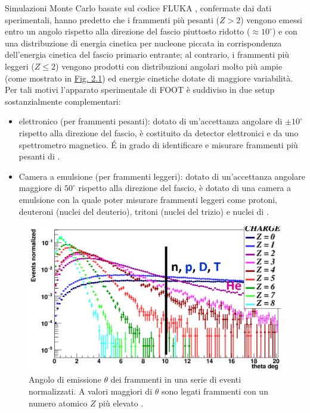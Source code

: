 \documentclass[12pt,a4paper,twoside]{report}
\begin{document}
	Simulazioni Monte Carlo basate sul codice FLUKA \cite{Ferrari:2005zk,BOHLEN2014211}, confermate dai dati sperimentali, hanno predetto che i frammenti più pesanti ($Z>2$) vengono emessi entro un angolo rispetto alla direzione del fascio piuttosto ridotto ($\approx10^\circ$) e con una distribuzione di energia cinetica per nucleone piccata in corrispondenza dell'energia cinetica del fascio primario entrante; al contrario, i frammenti più leggeri ($Z\le2$) vengono prodotti con distribuzioni angolari molto più ampie (come mostrato in \hyperref[fig:angular]{Fig. 2.1}) ed energie cinetiche dotate di maggiore variabilità. Per tali motivi l'apparato sperimentale di FOOT è suddiviso in due setup sostanzialmente complementari:
	\begin{itemize}
		\item elettronico (per frammenti pesanti): dotato di un'accettanza angolare di $\pm10^\circ$ rispetto alla direzione del fascio, è costituito da detector elettronici e da uno spettrometro magnetico. \'E in grado di identificare e misurare frammenti più pesanti di .
		\item Camera a emulsione (per frammenti leggeri): dotato di un'accettanza angolare maggiore di $50^\circ$ rispetto alla direzione del fascio, è dotato di una camera a emulsione con la quale poter misurare frammenti leggeri come protoni, deuteroni (nuclei del deuterio), tritoni (nuclei del trizio) e nuclei di .
	\end{itemize}
	\begin{figure}[H]
		\centering
		\includegraphics[width=0.8\linewidth]{angular.png}
		\caption{Angolo di emissione $\theta$ dei frammenti in una serie di eventi normalizzati. A valori maggiori di $\theta$ sono legati frammenti con un numero atomico $Z$ più elevato \cite{slide_spighi}.}
		\label{fig:angular}
	\end{figure}
	
\end{document}
